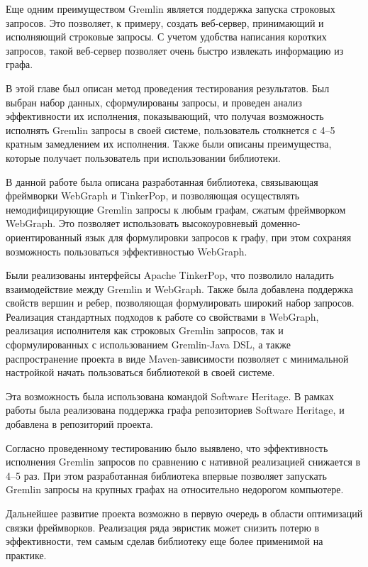 \documentclass[times,specification,annotation]{itmo-student-thesis}
\begin{document}
Еще одним преимуществом Gremlin является поддержка запуска строковых запросов. Это позволяет, к примеру, создать веб-сервер, принимающий и исполняющий строковые запросы. С учетом удобства написания коротких запросов, такой веб-сервер позволяет очень быстро извлекать информацию из графа.

\chapterconclusion

В этой главе был описан метод проведения тестирования результатов. Был выбран набор данных, сформулированы запросы, и проведен анализ эффективности их исполнения, показывающий, что получая возможность исполнять Gremlin запросы в своей системе, пользователь столкнется с 4--5 кратным замедлением их исполнения. Также были описаны преимущества, которые получает пользователь при использовании библиотеки.

\startconclusionpage

В данной работе была описана разработанная библиотека, связывающая фреймворки WebGraph и TinkerPop, и позволяющая осуществлять немодифицирующие Gremlin запросы к любым графам, сжатым фреймворком WebGraph. Это позволяет использовать высокоуровневый доменно-ориентированный язык для формулировки запросов к графу, при этом сохраняя возможность пользоваться эффективностью WebGraph.

Были реализованы интерфейсы Apache TinkerPop, что позволило наладить взаимодействие между Gremlin и WebGraph. Также была добавлена поддержка свойств вершин и ребер, позволяющая формулировать широкий набор запросов. Реализация стандартных подходов к работе со свойствами в WebGraph, реализация исполнителя как строковых Gremlin запросов, так и сформулированных с использованием Gremlin-Java DSL, а также распространение проекта в виде Maven-зависимости позволяет с минимальной настройкой начать пользоваться библиотекой в своей системе.

Эта возможность была использована командой Software Heritage. В рамках работы была реализована поддержка графа репозиториев Software Heritage, и добавлена в репозиторий проекта.

Согласно проведенному тестированию было выявлено, что эффективность исполнения Gremlin запросов по сравнению с нативной реализацией снижается в 4--5 раз. При этом разработанная библиотека впервые позволяет запускать Gremlin запросы на крупных графах на относительно недорогом компьютере.

Дальнейшее развитие проекта возможно в первую очередь в области оптимизаций связки фреймворков. Реализация ряда эвристик может снизить потерю в эффективности, тем самым сделав библиотеку еще более применимой на практике.
\end{document}
